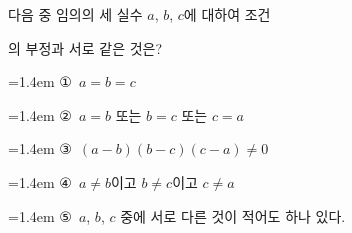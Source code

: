 다음 중 임의의 세 실수 $a$, $b$, $c$에 대하여 조건\par\smallskip{}\par\smallskip\noindent 의 부정과 서로 같은 것은?
\par\medskip\par\noindent\hangindent=1.4em {\small ①}\ $a=b=c$\par\noindent\hangindent=1.4em {\small ②}\ $a=b$ 또는 $b=c$ 또는 $c=a$\par\noindent\hangindent=1.4em {\small ③}\ $(a-b)(b-c)(c-a)\ne 0$\par\noindent\hangindent=1.4em {\small ④}\ $a\ne b$이고 $b\ne c$이고 $c\ne a$\par\noindent\hangindent=1.4em {\small ⑤}\ $a$, $b$, $c$ 중에 서로 다른 것이 적어도 하나 있다.\par\medskip

